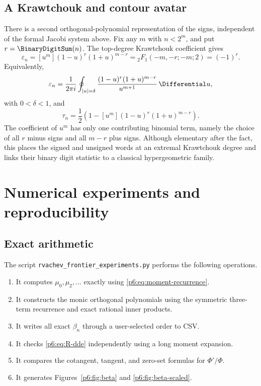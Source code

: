 \documentclass[11pt]{article}
\theoremstyle{definition}
\theoremstyle{remark}
\newcommand{\eps}{\varepsilon}
\begin{document}
\subsection{A Krawtchouk and contour avatar}

There is a second orthogonal-polynomial representation of the signs, independent of the
formal Jacobi system above.  Fix any \(m\) with \(n<2^m\), and put
\(r=\BinaryDigitSum(n)\).  The top-degree Krawtchouk coefficient \cite{p6:Koekoek} gives
\begin{equation}
\boxed{
 \eps_n=[u^m](1-u)^r(1+u)^{m-r}
 ={}_2F_1(-m,-r;-m;2)=(-1)^r.}                             \label{p6:eq:tm-krawtchouk}
\end{equation}
Equivalently,
\begin{equation}
 \eps_n=\frac1{2\pi i}\oint_{|u|=\delta}
 \frac{(1-u)^r(1+u)^{m-r}}{u^{m+1}}\,\Differential u,               \label{p6:eq:tm-krawtchouk-contour}
\end{equation}
with \(0<\delta<1\), and
\begin{equation}
 \tau_n=\frac12\left(1-[u^m](1-u)^r(1+u)^{m-r}\right).    \label{p6:eq:tau-krawtchouk}
\end{equation}
The coefficient of \(u^m\) has only one contributing binomial term, namely the choice of
all \(r\) minus signs and all \(m-r\) plus signs.  Although elementary after the fact,
this places the signed and unsigned words at an extremal Krawtchouk degree and links their
binary digit statistic to a classical hypergeometric family.



\section{Numerical experiments and reproducibility}

\subsection{Exact arithmetic}

The script \texttt{rvachev\_frontier\_experiments.py} performs the following operations.

\begin{enumerate}
\item It computes \(\mu_0,\mu_2,\dots\) exactly using \eqref{p6:eq:moment-recurrence}.
\item It constructs the monic orthogonal polynomials using the symmetric three-term
      recurrence and exact rational inner products.
\item It writes all exact \(\beta_n\) through a user-selected order to CSV.
\item It checks \eqref{p6:eq:R-dde} independently using a long moment expansion.
\item It compares the cotangent, tangent, and zero-set formulas for \(\Phi'/\Phi\).
\item It generates Figures~\ref{p6:fig:beta} and \ref{p6:fig:beta-scaled}.
\end{enumerate}
\end{document}
